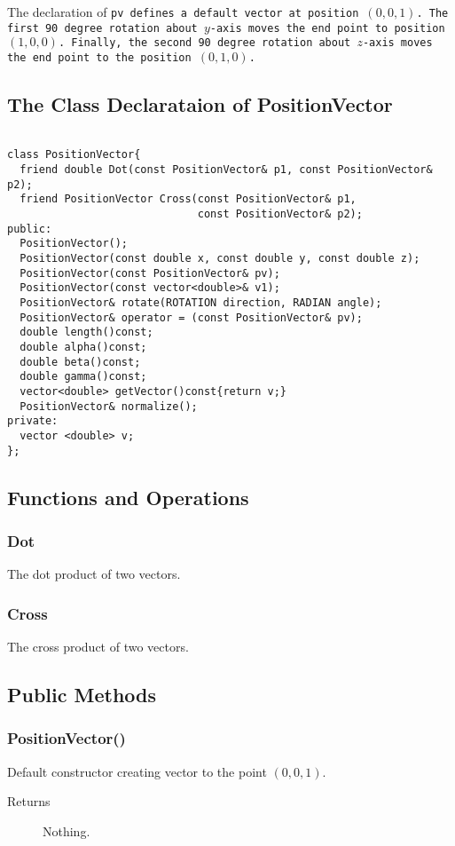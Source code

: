 The declaration of \tt pv \rm defines a default vector at position $(0,0,1)$.
The first 90 degree rotation about $y$-axis moves the end point to position 
$(1,0,0)$. Finally, the second 90 degree rotation about $z$-axis 
moves the end point to the position $(0,1,0)$.
 
\subsection{The Class Declarataion of PositionVector}
\begin{verbatim}
 
class PositionVector{
  friend double Dot(const PositionVector& p1, const PositionVector& p2);
  friend PositionVector Cross(const PositionVector& p1, 
                              const PositionVector& p2);  
public:
  PositionVector();
  PositionVector(const double x, const double y, const double z);
  PositionVector(const PositionVector& pv);
  PositionVector(const vector<double>& v1);
  PositionVector& rotate(ROTATION direction, RADIAN angle);
  PositionVector& operator = (const PositionVector& pv);
  double length()const;
  double alpha()const;
  double beta()const;
  double gamma()const;
  vector<double> getVector()const{return v;}
  PositionVector& normalize(); 
private:
  vector <double> v;
};
\end{verbatim}

\subsection{Functions and Operations}
\subsubsection{Dot}
The  dot product of two vectors.

\subsubsection{Cross}
The cross product of two vectors.

\subsection{Public Methods}
\subsubsection{PositionVector()}
Default constructor creating vector to the point $(0,0,1)$. 
    \begin{description}
       \item [Returns] Nothing.
    \end{description} 

